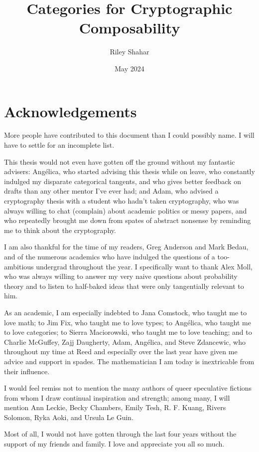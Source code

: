 \documentclass[12pt,twoside]{reedthesis}
\title{Categories for Cryptographic Composability}
\author{Riley Shahar}
\date{May 2024}
\begin{document}
\maketitle
\frontmatter
\pagestyle{empty}

\chapter*{Acknowledgements}

More people have contributed to this document than I could possibly name. I will
have to settle for an incomplete list.

This thesis would not even have gotten off the ground without my fantastic
advisers: Angélica, who started advising this thesis while on leave, who
constantly indulged my disparate categorical tangents, and who gives better
feedback on drafts than any other mentor I've ever had; and Adam, who advised a
cryptography thesis with a student who hadn't taken cryptography, who was always
willing to chat (complain) about academic politics or messy papers, and who
repeatedly brought me down from spates of abstract nonsense by reminding me to
think about the cryptography.

I am also thankful for the time of my readers, Greg Anderson and Mark Bedau, and
of the numerous academics who have indulged the questions of a too-ambitious
undergrad throughout the year. I specifically want to thank Alex Moll, who was
always willing to answer my very naive questions about probability theory and to
listen to half-baked ideas that were only tangentially relevant to him.

As an academic, I am especially indebted to Jana Comstock, who taught me to love
math; to Jim Fix, who taught me to love types; to Angélica, who taught me to
love categories; to Sierra Maciorowski, who taught me to love teaching; and to
Charlie McGuffey, Zajj Daugherty, Adam, Angélica, and Steve Zdancewic, who
throughout my time at Reed and especially over the last year have given me
advice and support in spades. The mathematician I am today is inextricable from
their influence.

I would feel remiss not to mention the many authors of queer speculative
fictions from whom I draw continual inspiration and strength; among many, I will
mention Ann Leckie, Becky Chambers, Emily Tesh, R. F. Kuang, Rivers Solomon,
Ryka Aoki, and Ursula Le Guin.

Most of all, I would not have gotten through the last four years without the
support of my friends and family. I love and appreciate you all so much.
\end{document}
